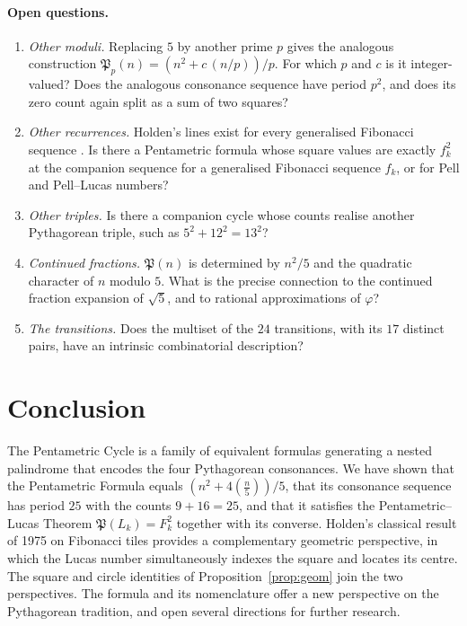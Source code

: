 \documentclass[11pt,a4paper]{article}
\newcommand{\Pent}{\mathfrak{P}}                      %
\newcommand{\leg}[1]{\left(\tfrac{#1}{5}\right)}      %
\theoremstyle{plain}
\theoremstyle{definition}
\theoremstyle{remark}
\begin{document}
\paragraph{Open questions.}
\begin{enumerate}[itemsep=2pt]
  \item \emph{Other moduli.} Replacing $5$ by another prime $p$ gives the analogous construction $\Pent_p(n)=(n^{2}+c\,(n/p))/p$. For which $p$ and $c$ is it integer-valued? Does the analogous consonance sequence have period $p^{2}$, and does its zero count again split as a sum of two squares?
  \item \emph{Other recurrences.} Holden's lines exist for every generalised Fibonacci sequence \cite{Holden1975,HoggattAlladi1975}. Is there a Pentametric formula whose square values are exactly $f_k^{2}$ at the companion sequence for a generalised Fibonacci sequence $f_k$, or for Pell and Pell–Lucas numbers?
  \item \emph{Other triples.} Is there a companion cycle whose counts realise another Pythagorean triple, such as $5^{2}+12^{2}=13^{2}$?
  \item \emph{Continued fractions.} $\Pent(n)$ is determined by $n^{2}/5$ and the quadratic character of $n$ modulo $5$. What is the precise connection to the continued fraction expansion of $\sqrt5$, and to rational approximations of $\varphi$?
  \item \emph{The transitions.} Does the multiset of the $24$ transitions, with its $17$ distinct pairs, have an intrinsic combinatorial description?
\end{enumerate}

\section{Conclusion}\label{sec:conclusion}

The Pentametric Cycle is a family of equivalent formulas generating a nested palindrome that encodes the four Pythagorean consonances. We have shown that the Pentametric Formula equals $(n^{2}+4\leg{n})/5$, that its consonance sequence has period $25$ with the counts $9+16=25$, and that it satisfies the Pentametric–Lucas Theorem $\Pent(L_k)=F_k^{2}$ together with its converse. Holden's classical result of 1975 on Fibonacci tiles provides a complementary geometric perspective, in which the Lucas number simultaneously indexes the square and locates its centre. The square and circle identities of Proposition~\ref{prop:geom} join the two perspectives. The formula and its nomenclature offer a new perspective on the Pythagorean tradition, and open several directions for further research.
\end{document}
